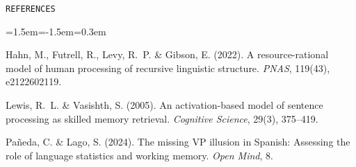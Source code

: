 \documentclass[12pt]{article}
\newcommand{\smallcapshead}[1]{{\color{accent}\small\texttt{\MakeUppercase{#1}}}\par\vspace{2pt}{\color{muted}\hrule}\vspace{8pt}}
\begin{document}
\vspace{14pt}
\smallcapshead{References}

{\small
\begin{list}{}{\leftmargin=1.5em\itemindent=-1.5em\itemsep=0.3em\parsep=0pt}
  \item Hahn, M., Futrell, R., Levy, R.~P. \& Gibson, E. (2022). A resource-rational model of human processing of recursive linguistic structure. \textit{PNAS}, 119(43), e2122602119.
  \item Lewis, R.~L. \& Vasishth, S. (2005). An activation-based model of sentence processing as skilled memory retrieval. \textit{Cognitive Science}, 29(3), 375--419.
  \item Pañeda, C. \& Lago, S. (2024). The missing VP illusion in Spanish: Assessing the role of language statistics and working memory. \textit{Open Mind}, 8.
\end{list}
\par}
\end{document}

